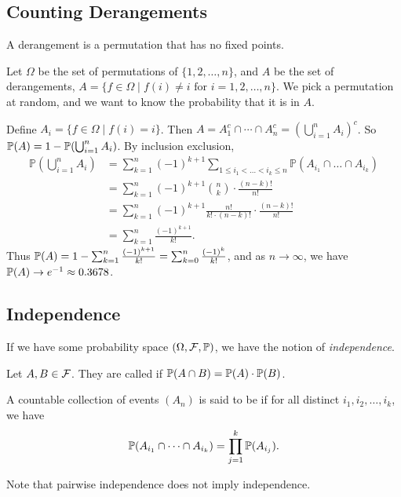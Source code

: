 \documentclass[a4paper]{scrreprt}
\begin{document}
\subsection{Counting Derangements}

A derangement is a permutation that has no fixed points.

Let $\Omega$ be the set of permutations of $\{1, 2, \dots, n\}$, and $A$ be the set of derangements, $A = \{f \in \Omega \mid f(i) \neq i \text{ for } i = 1,2, \dots, n\}$.
We pick a permutation at random, and we want to know the probability that it is in $A$.

Define $A_i = \{ f \in \Omega \mid f(i) = i\}$. Then $A = A_1^c \cap \cdots \cap A_n^c = \left(\bigcup_{i = 1}^{n} A_i\right)^c$. So $\mathbb{P}(A) = 1 - \mathbb{P}(\bigcup_{i = 1}^n A_i)$. By inclusion exclusion,
\begin{align*}
\mathbb{P}\left(\bigcup_{i=1}^{n} A_{i}\right)&=\sum_{k=1}^{n}(-1)^{k+1} \sum_{1 \leq i_{1}<\ldots<i_{k} \leq n} \mathbb{P}\left(A_{i_1} \cap \ldots \cap A_{i_{k}}\right)\\
&= \sum_{k = 1}^n (-1)^{k + 1} \binom{n}{k} \cdot \frac{(n - k)!}{n!} \\
&= \sum_{k = 1}^n (-1)^{k + 1} \frac{n!}{k! \cdot (n - k)!}
 \cdot \frac{(n - k)!}{n!} \\
 &= \sum_{k = 1}^n \frac{(-1)^{k + 1}}{k!}.
 \end{align*}
Thus $\mathbb{P}(A) = 1 - \sum_{k = 1}^n \frac{(-1)^{k + 1}}{k!} = \sum_{k = 0}^{n} \frac{(-1)^k}{k!}$, and as $n \rightarrow \infty$, we have $\mathbb{P}(A) \rightarrow e^{-1} \approx 0.3678$.

\subsection{Independence}

If we have some probability space $(\Omega, \mathcal{F}, \mathbb{P})$, we have the notion of \emph{independence}.

\begin{definition}[Independence]
Let $A, B \in \mathcal{F}$. They are called  if $\mathbb{P}(A \cap B) = \mathbb{P}(A) \cdot \mathbb{P}(B)$.

A countable collection of events $(A_n)$ is said to be  if for all distinct $i_1, i_2, \dots, i_k$, we have
$$
\mathbb{P}(A_{i_1} \cap \cdots \cap A_{i_k}) = \prod_{j = 1}^k \mathbb{P}(A_{i_j}).
$$
\end{definition}

Note that pairwise independence does not imply independence.
\end{document}
